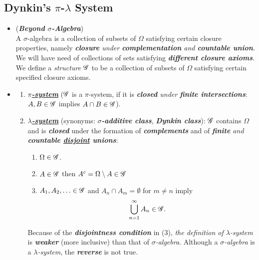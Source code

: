 \documentclass[11pt]{article}
\begin{document}
\subsection{Dynkin's $\pi$-$\lambda$ System}
\begin{itemize}
\item \begin{remark} (\emph{\textbf{Beyond $\sigma$-Algebra}})\\
A $\sigma$-algebra is a collection of subsets of $\Omega$ satisfying certain closure properties, namely \emph{\textbf{closure} under \textbf{complementation} and \textbf{countable union}}. We will have need of collections of sets satisfying \emph{\textbf{different closure axioms}}. We define a \emph{structure} ${\mathscr G}$ to be a collection of subsets of $\Omega$ satisfying certain specified closure axioms. 
\end{remark}

\item 
\begin{definition}\citep{resnick2013probability, billingsley2008probability}
\begin{enumerate}
\item \underline{\emph{\textbf{$\pi$-system}}} (${\mathscr G}$ is a $\pi$-system, if it is \emph{\textbf{closed} under \textbf{finite intersections}}: $A , B \in {\mathscr G}$ implies $A \cap B \in {\mathscr G}$).
\item \underline{\emph{\textbf{$\lambda$-system}}} (synonyms: \emph{\textbf{$\sigma$-additive class}}, \emph{\textbf{Dynkin class}}): ${\mathscr G}$ contains $\Omega$ and is \textbf{\emph{closed}} under the formation of \emph{\textbf{complements}} and of \emph{\textbf{finite} and \textbf{countable \underline{disjoint} unions}}:
\begin{enumerate}
\item $\Omega \in {\mathscr G}$.
\item $A \in {\mathscr G}$ then $A^{c} = \Omega \setminus A \in {\mathscr G}$
\item $A_1, A_2, \ldots \in {\mathscr G}$ and $A_n \cap A_m = \emptyset$ for $m \neq n$ imply 
\begin{align*}
\bigcup_{n=1}^{\infty}A_{n} \in {\mathscr G}.
\end{align*}
\end{enumerate}
Because of the \emph{\textbf{disjointness condition}} in (3), \emph{the definition of $\lambda$-system} is \emph{\textbf{weaker}} (more inclusive) than that of \emph{$\sigma$-algebra}. Although a \emph{$\sigma$-algebra} is a \emph{$\lambda$-system}, the \emph{\textbf{reverse}} is not true.
\end{enumerate}
\end{definition}


\end{itemize}
\end{document}
